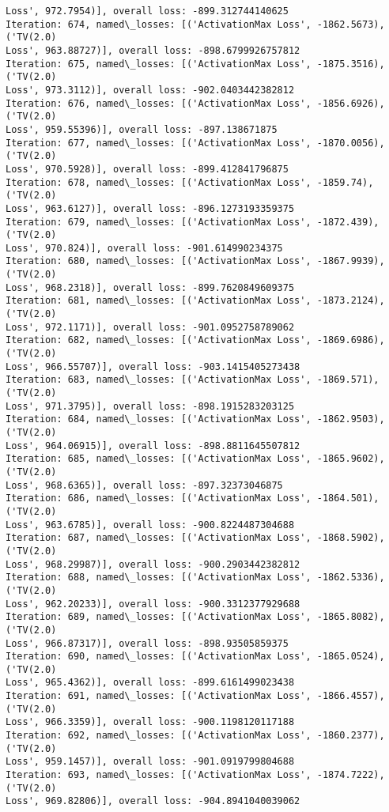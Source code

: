 \documentclass[10pt]{article}
\begin{document}
\begin{Verbatim}[commandchars=\\\{\}]
Loss', 972.7954)], overall loss: -899.312744140625
Iteration: 674, named\_losses: [('ActivationMax Loss', -1862.5673), ('TV(2.0)
Loss', 963.88727)], overall loss: -898.6799926757812
Iteration: 675, named\_losses: [('ActivationMax Loss', -1875.3516), ('TV(2.0)
Loss', 973.3112)], overall loss: -902.0403442382812
Iteration: 676, named\_losses: [('ActivationMax Loss', -1856.6926), ('TV(2.0)
Loss', 959.55396)], overall loss: -897.138671875
Iteration: 677, named\_losses: [('ActivationMax Loss', -1870.0056), ('TV(2.0)
Loss', 970.5928)], overall loss: -899.412841796875
Iteration: 678, named\_losses: [('ActivationMax Loss', -1859.74), ('TV(2.0)
Loss', 963.6127)], overall loss: -896.1273193359375
Iteration: 679, named\_losses: [('ActivationMax Loss', -1872.439), ('TV(2.0)
Loss', 970.824)], overall loss: -901.614990234375
Iteration: 680, named\_losses: [('ActivationMax Loss', -1867.9939), ('TV(2.0)
Loss', 968.2318)], overall loss: -899.7620849609375
Iteration: 681, named\_losses: [('ActivationMax Loss', -1873.2124), ('TV(2.0)
Loss', 972.1171)], overall loss: -901.0952758789062
Iteration: 682, named\_losses: [('ActivationMax Loss', -1869.6986), ('TV(2.0)
Loss', 966.55707)], overall loss: -903.1415405273438
Iteration: 683, named\_losses: [('ActivationMax Loss', -1869.571), ('TV(2.0)
Loss', 971.3795)], overall loss: -898.1915283203125
Iteration: 684, named\_losses: [('ActivationMax Loss', -1862.9503), ('TV(2.0)
Loss', 964.06915)], overall loss: -898.8811645507812
Iteration: 685, named\_losses: [('ActivationMax Loss', -1865.9602), ('TV(2.0)
Loss', 968.6365)], overall loss: -897.32373046875
Iteration: 686, named\_losses: [('ActivationMax Loss', -1864.501), ('TV(2.0)
Loss', 963.6785)], overall loss: -900.8224487304688
Iteration: 687, named\_losses: [('ActivationMax Loss', -1868.5902), ('TV(2.0)
Loss', 968.29987)], overall loss: -900.2903442382812
Iteration: 688, named\_losses: [('ActivationMax Loss', -1862.5336), ('TV(2.0)
Loss', 962.20233)], overall loss: -900.3312377929688
Iteration: 689, named\_losses: [('ActivationMax Loss', -1865.8082), ('TV(2.0)
Loss', 966.87317)], overall loss: -898.93505859375
Iteration: 690, named\_losses: [('ActivationMax Loss', -1865.0524), ('TV(2.0)
Loss', 965.4362)], overall loss: -899.6161499023438
Iteration: 691, named\_losses: [('ActivationMax Loss', -1866.4557), ('TV(2.0)
Loss', 966.3359)], overall loss: -900.1198120117188
Iteration: 692, named\_losses: [('ActivationMax Loss', -1860.2377), ('TV(2.0)
Loss', 959.1457)], overall loss: -901.0919799804688
Iteration: 693, named\_losses: [('ActivationMax Loss', -1874.7222), ('TV(2.0)
Loss', 969.82806)], overall loss: -904.8941040039062

\end{Verbatim}
\end{document}
